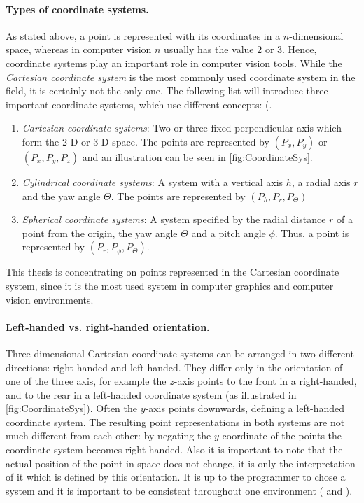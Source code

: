 \paragraph{Types of coordinate systems.}
As stated above, a point is represented with its coordinates in a $n$-dimensional space, whereas in computer vision $n$ usually has the value $2$ or $3$. Hence, coordinate systems play an important role in computer vision tools. While the \textit{Cartesian coordinate system} is the most commonly used coordinate system in the field, it is certainly not the only one. The following list will introduce three important coordinate systems, which use different concepts: (\cite[p.166 et seq.]{Gregory.2014}.  
\begin{enumerate}[i]
\item \textit{Cartesian coordinate systems}: Two or three fixed perpendicular axis which form the 2-D or 3-D space. The points are represented by $(P_x,P_y)$ or $(P_x,P_y,P_z)$ and an illustration can be seen in \autoref{fig:CoordinateSys}.  
\item \textit{Cylindrical coordinate systems}: A system with a vertical axis $h$, a radial axis $r$ and the yaw angle $\Theta$. The points are represented by $(P_h,P_r,P_\Theta)$
\item \textit{Spherical coordinate systems}: A system specified by the radial distance $r$ of a point from the origin, the yaw angle $\Theta$ and a pitch angle $\phi$. Thus, a point is represented by $(P_r,P_\phi,P_\Theta)$.
\end{enumerate}

This thesis is concentrating on points represented in the Cartesian coordinate system, since it is the most used system in computer graphics and computer vision environments.

\paragraph{Left-handed vs. right-handed orientation.}
Three-dimensional Cartesian coordinate systems can be arranged in two different directions: right-handed and left-handed. They differ only in the orientation of one of the three axis, for example the $z$-axis points to the front in a right-handed, and to the rear in a left-handed coordinate system (as illustrated in \autoref{fig:CoordinateSys}). Often the $y$-axis points downwards, defining a left-handed coordinate system. The resulting point representations in both systems are not much different from each other: by negating the $y$-coordinate of the points the coordinate system becomes right-handed. Also it is important to note that the actual position of the point in space does not change, it is only the interpretation of it which is defined by this orientation. It is up to the programmer to chose a system and it is important to be consistent throughout one environment (\cite[p.164 et seq.]{Hartley.2011} and \cite[p.167 et seq.]{Gregory.2014}). 


